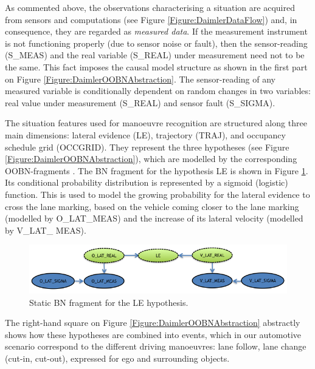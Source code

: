 As commented above, the observations characterising a situation are acquired from sensors and computations (see Figure \ref{Figure:DaimlerDataFlow}) and, in consequence, they are regarded as  \textit{measured data}. If the measurement instrument is not functioning properly (due to sensor noise or fault), then the sensor-reading (S\_MEAS) and the real variable (S\_REAL) under measurement need not to be the same. This fact imposes the causal model structure as shown in the first part on Figure \ref{Figure:DaimlerOOBNAbstraction}. The sensor-reading of any measured variable is conditionally dependent on random changes in two variables: real value under measurement (S\_REAL) and sensor fault (S\_SIGMA).

The situation features used for manoeuvre recognition are structured along three main dimensions: lateral evidence (LE), trajectory (TRAJ), and occupancy schedule grid (OCCGRID). They represent the three hypotheses (see Figure \ref{Figure:DaimlerOOBNAbstraction}), which are modelled by the corresponding OOBN-fragments \cite{kasper2012object}. The BN fragment for the hypothesis LE is shown in Figure \ref{Figure:DaimlerLE}. Its conditional probability distribution is represented by a sigmoid (logistic) function. This is used to model the growing probability for the lateral evidence to cross the lane marking, based on the vehicle coming closer to the lane marking (modelled by O\_LAT\_MEAS) and the increase of its lateral velocity (modelled by V\_LAT\_ MEAS).

\begin{figure}
\begin{center}
\includegraphics[scale=0.58]{./figures/DaimlerLE}
\caption{\label{Figure:DaimlerLE} Static BN fragment for the LE hypothesis.}
\end{center}
\end{figure}

The right-hand square on Figure \ref{Figure:DaimlerOOBNAbstraction} abstractly shows how these hypotheses are combined into events, which in our automotive scenario correspond to the different driving manoeuvres: lane follow, lane change (cut-in, cut-out), expressed for ego and surrounding objects\cite{kasper2012object}.
